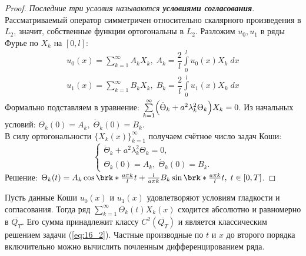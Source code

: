 \documentclass[../main.tex]{subfiles}
\begin{document}
\begin{proof}
\textit{Последние три условия называются \textbf{условиями согласования}}. \\
Рассматриваемый оператор симметричен относительно скалярного произведения в $L_2$, значит, собственные функции ортогональны в $L_2$. Разложим $u_0, u_1$ в ряды Фурье по $X_k$ на $[0, l]$:
\begin{align*}
	u_0(x) = \sum\limits_{k = 1}^{\infty} A_kX_k,\; A_k = \dfrac{2}{l} \int\limits_{0}^l u_0(x)X_k\;dx \\
	u_1(x) = \sum\limits_{k = 1}^{\infty} B_kX_k,\; B_k = \dfrac{2}{l} \int\limits_{0}^l u_1(x)X_k\;dx 
\end{align*}
Формально подставляем в уравнение: $\sum\limits_{k = 1}^{\infty} \Bigl( \ddot{\Theta}_k + a^2 \lambda_k^2\Theta_k \Bigr)X_k = 0$. Из начальных условий: $\Theta_k(0) = A_k,\; \dot{\Theta}_k(0) = B_k$. \\
В силу ортогональности $\{X_k(x)\}_{k = 1}^{\infty}$ получаем счётное число задач Коши:
\begin{equation*}
\begin{cases}
	\ddot{\Theta}_k + a^2 \lambda_k^2\Theta_k = 0, \\
	\Theta_k(0) = A_k,\; \dot{\Theta}_k(0) = B_k.
\end{cases}
\end{equation*}
Решение: $\Theta_k(t) = A_k\cos \brk*{\frac{a \pi k}{l}}t + \frac{l}{a \pi k}B_k \sin \brk*{\frac{a \pi k}{l}}t,\; t \in [0, T]$. 
\end{proof}
\begin{theorem}
Пусть данные Коши $u_0(x)$ и $u_1(x)$ удовлетворяют условиям гладкости и согласования. Тогда ряд $\sum\limits_{k = 1}^{\infty}\Theta_k(t)X_k(x)$ сходится абсолютно и равномерно в $\overline{Q_T}$. Его сумма принадлежит классу $C^2(\overline{Q_T})$ и является классическим решением задачи (\ref{eq:16_2}). Частные производные по $t$ и $x$ до второго порядка 
включительно можно вычислить почленным дифференцированием ряда.
\end{theorem} 
\end{document}
